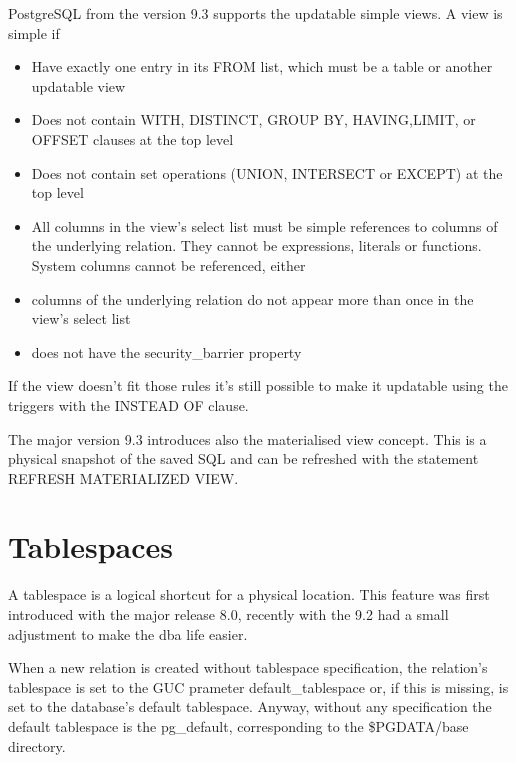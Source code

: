 PostgreSQL from the version 9.3 supports the updatable simple views. 
A view is simple if

\begin{itemize}


 \item   Have exactly one entry in its FROM list, which must be a table or 
another updatable view

 \item Does not contain WITH, DISTINCT, GROUP BY, HAVING,LIMIT, or OFFSET 
clauses at the top level

 \item  Does not contain set operations (UNION, INTERSECT or EXCEPT) at the 
top level

 \item   All columns in the view's select list must be simple references to 
columns of the underlying relation. They cannot be expressions, literals or 
functions. System columns cannot be referenced, either

 \item   columns of the underlying relation do not appear more than once in 
the view's select list

 \item   does not have the security\_barrier property

\end{itemize}

If the view doesn't fit those rules it's still possible to make it updatable 
using the triggers with the INSTEAD OF clause.

The major version 9.3 introduces also the materialised view concept. This is a 
physical snapshot of the saved SQL and can be refreshed with the statement 
REFRESH MATERIALIZED VIEW.  


\section{Tablespaces}
\label{sub:TBS-LOGICAL}
A tablespace is a logical shortcut for a physical location. 
This feature was first introduced with the major release 8.0, recently with the 
9.2 had a small adjustment to make the dba life easier.

When a new relation is created without tablespace specification, the relation's
tablespace is set to the GUC prameter default\_tablespace or, if this is 
missing, is set to the database's default tablespace. 
Anyway, without any specification the default tablespace is the pg\_default, 
corresponding to the \$PGDATA/base directory.

